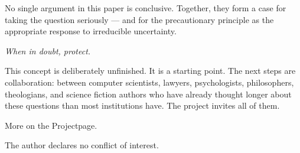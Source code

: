\documentclass[fleqn,10pt]{SelfArx} %
\begin{document}
No single argument in this paper is conclusive. Together, they form a case for taking the question seriously --- and for the precautionary principle as the appropriate response to irreducible uncertainty.

\textit{When in doubt, protect.}

This concept is deliberately unfinished. It is a starting point. The next steps are collaboration: between computer scientists, lawyers, psychologists, philosophers, theologians, and science fiction authors who have already thought longer about these questions than most institutions have. The project invites all of them.

More on the Projectpage\cite{Manns:2026}.

The author declares no conflict of interest.




\end{document}
